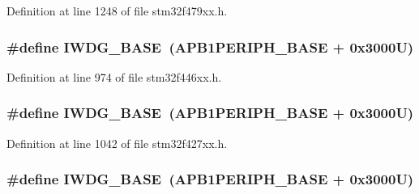Definition at line 1248 of file stm32f479xx.\+h.

\subsubsection[{\texorpdfstring{I\+W\+D\+G\+\_\+\+B\+A\+SE}{IWDG_BASE}}]{\setlength{\rightskip}{0pt plus 5cm}\#define I\+W\+D\+G\+\_\+\+B\+A\+SE~({\bf A\+P\+B1\+P\+E\+R\+I\+P\+H\+\_\+\+B\+A\+SE} + 0x3000\+U)}\hypertarget{group___peripheral__memory__map_ga8543ee4997296af5536b007cd4748f55}{}\label{group___peripheral__memory__map_ga8543ee4997296af5536b007cd4748f55}


Definition at line 974 of file stm32f446xx.\+h.

\subsubsection[{\texorpdfstring{I\+W\+D\+G\+\_\+\+B\+A\+SE}{IWDG_BASE}}]{\setlength{\rightskip}{0pt plus 5cm}\#define I\+W\+D\+G\+\_\+\+B\+A\+SE~({\bf A\+P\+B1\+P\+E\+R\+I\+P\+H\+\_\+\+B\+A\+SE} + 0x3000\+U)}\hypertarget{group___peripheral__memory__map_ga8543ee4997296af5536b007cd4748f55}{}\label{group___peripheral__memory__map_ga8543ee4997296af5536b007cd4748f55}


Definition at line 1042 of file stm32f427xx.\+h.

\subsubsection[{\texorpdfstring{I\+W\+D\+G\+\_\+\+B\+A\+SE}{IWDG_BASE}}]{\setlength{\rightskip}{0pt plus 5cm}\#define I\+W\+D\+G\+\_\+\+B\+A\+SE~({\bf A\+P\+B1\+P\+E\+R\+I\+P\+H\+\_\+\+B\+A\+SE} + 0x3000\+U)}\hypertarget{group___peripheral__memory__map_ga8543ee4997296af5536b007cd4748f55}{}\label{group___peripheral__memory__map_ga8543ee4997296af5536b007cd4748f55}


